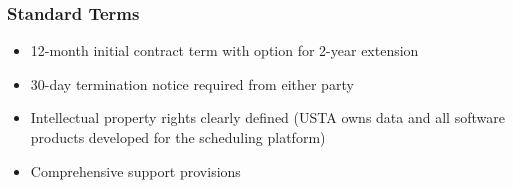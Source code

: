 \subsubsection{Standard Terms}
\begin{itemize}
    \item 12-month initial contract term with option for 2-year extension
    \item 30-day termination notice required from either party
    \item Intellectual property rights clearly defined (USTA owns data and all software products developed for the scheduling platform)
    \item Comprehensive support provisions 
\end{itemize}


